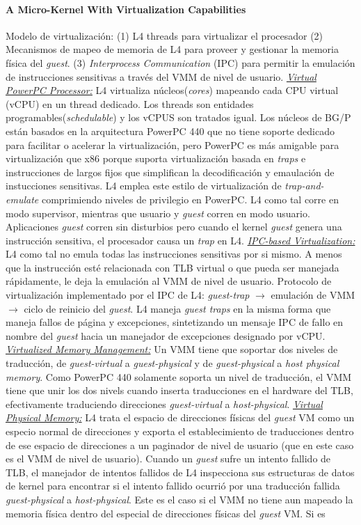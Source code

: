 \paragraph{\textnormal{\textbf{A Micro-Kernel With Virtualization Capabilities}}}
Modelo de virtualización: (1) L4 threads para virtualizar el procesador (2) Mecanismos de mapeo de memoria de L4 para proveer y gestionar la memoria física del \emph{guest}. (3) \emph{Interprocess Communication} (IPC) para permitir la emulación de instrucciones sensitivas a través del VMM de nivel de usuario. \underline{\emph{Virtual PowerPC Processor:}} L4 virtualiza núcleos(\emph{cores}) mapeando cada CPU virtual (vCPU) en un thread dedicado. Los threads son entidades programables(\emph{schedulable}) y los vCPUS son tratados igual. Los núcleos de BG/P están basados en la arquitectura PowerPC 440 que no tiene soporte dedicado para facilitar o acelerar la virtualización, pero PowerPC es más amigable para virtualización que x86 porque suporta virtualización basada en \emph{traps} e instrucciones de largos fijos que simplifican la decodificación y emaulación de instucciones sensitivas. L4 emplea este estilo de virtualización de \emph{trap-and-emulate} comprimiendo niveles de privilegio en PowerPC. L4 como tal corre en modo supervisor, mientras que usuario y \emph{guest} corren en modo usuario. Aplicaciones \emph{guest} corren sin disturbios pero cuando el kernel \emph{guest} genera una instrucción sensitiva, el procesador causa un \emph{trap} en L4. \underline{\emph{IPC-based Virtualization:}} L4 como tal no emula todas las instrucciones sensitivas por si mismo. A menos que la instrucción esté relacionada con TLB virtual o que pueda ser manejada rápidamente, le deja la emulación al VMM de nivel de usuario. Protocolo de virtualización implementado por el IPC de L4: \emph{guest-trap} $\rightarrow$ emulación de VMM $\rightarrow$ ciclo de reinicio del \emph{guest}. L4 maneja \emph{guest traps} en la misma forma que maneja fallos de página y excepciones, sintetizando un mensaje IPC de fallo en nombre del \emph{guest} hacia un manejador de excepciones designado por vCPU. \underline{\emph{Virtualized Memory Management:}} Un VMM tiene que soportar dos niveles de traducción, de \emph{guest-virtual} a \emph{guest-physical} y de \emph{guest-physical} a \emph{host physical memory}. Como PowerPC 440 solamente soporta un nivel de traducción, el VMM tiene que unir los dos nivels cuando inserta traducciones en el hardware del TLB, efectivamente traduciendo direcciones \emph{guest-virtual} a \emph{host-physical}. \underline{\emph{Virtual Physical Memory:}} L4 trata el espacio de direcciones físicas del \emph{guest} VM como un especio normal de direcciones y exporta el establecimiento de traducciones dentro de ese espacio de direcciones a un paginador de nivel de usuario (que en este caso es el VMM de nivel de usuario). Cuando un \emph{guest} sufre un intento fallido de TLB, el manejador de intentos fallidos de L4 inspecciona sus estructuras de datos de kernel para encontrar si el intento fallido ocurrió por una traducción fallida \emph{guest-physical} a \emph{host-physical}. Este es el caso si el VMM no tiene aun mapeado la memoria física dentro del especial de direcciones físicas del \emph{guest} VM. Si es 